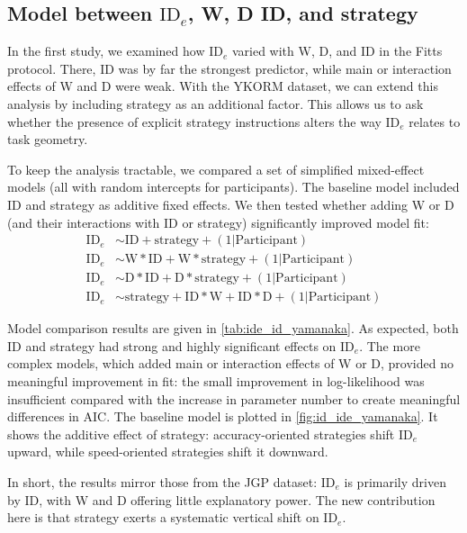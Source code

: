 \documentclass[acmlarge, manuscript,review]{acmart}
\newcommand{\ide}{\ensuremath{{\text{ID}_e}}\xspace}
\newcommand{\D}{\ensuremath{{\text{D}}}\xspace}
\newcommand{\W}{\ensuremath{{\text{W}}}\xspace}
\begin{document}
\subsection{Model between \ide, W, D ID, and strategy}
In the first study, we examined how \ide varied with W, D, and ID in the Fitts protocol. There, ID was by far the strongest predictor, while main or interaction effects of W and D were weak. With the YKORM dataset, we can extend this analysis by including strategy as an additional factor. This allows us to ask whether the presence of explicit strategy instructions alters the way \ide relates to task geometry.

To keep the analysis tractable, we compared a set of simplified mixed-effect models (all with random intercepts for participants). The baseline model included ID and strategy as additive fixed effects. We then tested whether adding W or D (and their interactions with ID or strategy) significantly improved model fit:
\begin{align}
  \ide & \sim  \text{ID} + \text{strategy} + (1|\text{Participant})\label{eq:ide_id_yamanaka_short} \\
  \ide & \sim \W*\text{ID} + \W*\text{strategy} + (1|\text{Participant})\label{eq:ide_id_yamanaka_W}\\
  \ide & \sim \D*\text{ID} + \D*\text{strategy} + (1|\text{Participant})\label{eq:ide_id_yamanaka_D}\\
  \ide & \sim \text{strategy} + \text{ID}*\W + \text{ID}*\D + (1|\text{Participant}) \label{eq:ide_id_yamanaka_full}
\end{align}

Model comparison results are given in \autoref{tab:ide_id_yamanaka}. As expected, both ID and strategy had strong and highly significant effects on \ide. The more complex models, which added main or interaction effects of W or D, provided no meaningful improvement in fit: the small improvement in log-likelihood was insufficient compared with the increase in parameter number to create meaningful differences in AIC.
The baseline model is plotted in \autoref{fig:id_ide_yamanaka}. It shows the additive effect of strategy: accuracy-oriented strategies shift \ide upward, while speed-oriented strategies shift it downward.

In short, the results mirror those from the JGP dataset: \ide is primarily driven by ID, with W and D offering little explanatory power. The new contribution here is that strategy exerts a systematic vertical shift on \ide.
\end{document}
